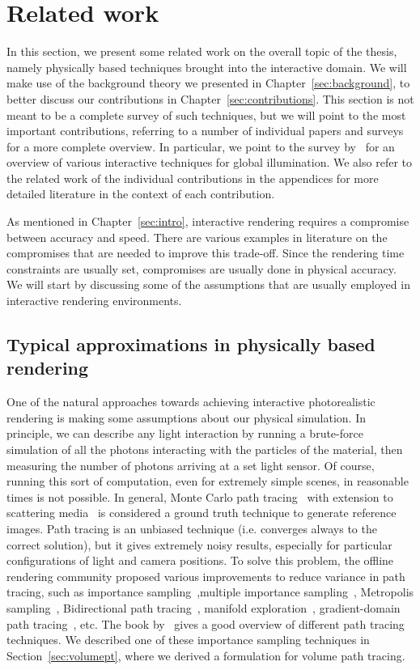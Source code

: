 \chapter{Related work}
%
\label{sec:related}
%
In this section, we present some related work on the overall topic of the thesis, namely physically based techniques brought into the interactive domain. We will make use of the background theory we presented in Chapter~\ref{sec:background}, to better discuss our contributions in Chapter~\ref{sec:contributions}. This section is not meant to be a complete survey of such techniques, but we will point to the most important contributions, referring to a number of individual papers and surveys for a more complete overview. In particular, we point to the survey by~\citet{Ritschel2012} for an overview of various interactive techniques for global illumination. We also refer to the related work of the individual contributions in the appendices for more detailed literature in the context of each contribution. 

As mentioned in Chapter~\ref{sec:intro}, interactive rendering requires a compromise between accuracy and speed. There are various examples in literature on the compromises that are needed to improve this trade-off. Since the rendering time constraints are usually set, compromises are usually done in physical accuracy. We will start by discussing some of the assumptions that are usually employed in interactive rendering environments. 
%
\section{Typical approximations in physically based rendering}

One of the natural approaches towards achieving interactive photorealistic rendering is making some assumptions about our physical simulation. In principle, we can describe any light interaction by running a brute-force simulation of all the photons interacting with the particles of the material, then measuring the number of photons arriving at a set light sensor. Of course, running this sort of computation, even for extremely simple scenes, in reasonable times is not possible. In general, Monte Carlo path tracing~\cite{Kajiya1986} with extension to scattering media~\cite{Rushmeier1988} is considered a ground truth technique to generate reference images. Path tracing is an unbiased technique (i.e. converges always to the correct solution), but it gives extremely noisy results, especially for particular configurations of light and camera positions. To solve this problem, the offline rendering community proposed various improvements to reduce variance in path tracing, such as importance sampling~\cite{Kirk1991},multiple importance sampling~\cite{Veach1995}, Metropolis sampling~\cite{Veach1995}, Bidirectional path tracing~\cite{Veach1997}, manifold exploration~\cite{Jakob2012}, gradient-domain path tracing~\cite{Kettunen2015}, etc. The book by~\citet{Pharr2017} gives a good overview of different path tracing techniques. We described one of these importance sampling techniques in Section~\ref{sec:volumept}, where we derived a formulation for volume path tracing.

